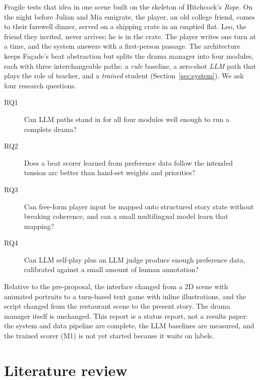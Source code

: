 \documentclass{article}
\newcommand{\fac}{Fa\c{c}ade}
\begin{document}
Fragile tests that idea in one scene built on the skeleton of Hitchcock's \emph{Rope}. On the night before Julian and Mia emigrate, the player, an old college friend, comes to their farewell dinner, served on a shipping crate in an emptied flat. Leo, the friend they invited, never arrives; he is in the crate. The player writes one turn at a time, and the system answers with a first-person passage. The architecture keeps \fac{}'s beat abstraction but splits the drama manager into four modules, each with three interchangeable paths: a \emph{rule} baseline, a zero-shot \emph{LLM} path that plays the role of teacher, and a \emph{trained} student (Section~\ref{sec:system}). We ask four research questions.
\begin{description}
  \item[RQ1] Can LLM paths stand in for all four modules well enough to run a complete drama?
  \item[RQ2] Does a beat scorer learned from preference data follow the intended tension arc better than hand-set weights and priorities?
  \item[RQ3] Can free-form player input be mapped onto structured story state without breaking coherence, and can a small multilingual model learn that mapping?
  \item[RQ4] Can LLM self-play plus an LLM judge produce enough preference data, calibrated against a small amount of human annotation?
\end{description}
Relative to the pre-proposal, the interface changed from a 2D scene with animated portraits to a turn-based text game with inline illustrations, and the script changed from the restaurant scene to the present story. The drama manager itself is unchanged. This report is a status report, not a results paper: the system and data pipeline are complete, the LLM baselines are measured, and the trained scorer (M1) is not yet started because it waits on labels.

\section{Literature review}
\label{sec:related}
\end{document}
